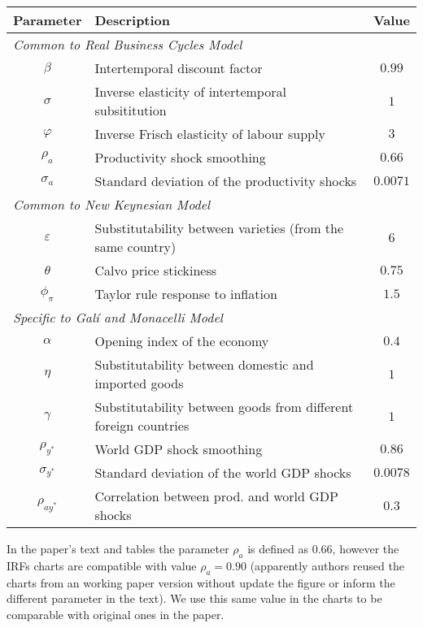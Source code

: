 \documentclass{article}
\begin{document}
\begin{table}[H]
    \centering
    \begin{tabular}{clc}
        \hline
        \textbf{Parameter} & \textbf{Description} & \textbf{Value}\\
        \hline
        \multicolumn{3}{l}{\textit{Common to Real Business Cycles Model}}\\
        $\beta$ & Intertemporal discount factor & $0.99$\\
        $\sigma$ & Inverse elasticity of intertemporal subsititution & $1$\\
        $\varphi$ & Inverse Frisch elasticity of labour supply & $3$\\
        $\rho_a$ & Productivity shock smoothing & $0.66$\\
        $\sigma_a$ & Standard deviation of the productivity shocks & $0.0071$ \\
        \multicolumn{3}{l}{\textit{Common to New Keynesian Model}}\\
        $\varepsilon$ & Substitutability between varieties (from the same country) & $6$\\
        $\theta$ & Calvo price stickiness & $0.75$\\
        $\phi_\pi$ & Taylor rule response to inflation & $1.5$ \\
        \multicolumn{3}{l}{\textit{Specific to Galí and Monacelli Model}}\\
        $\alpha$ & Opening index of the economy  & $0.4$\\
        $\eta$ & Substitutability between domestic and imported goods & $1$\\
        $\gamma$ & Substitutability between goods from different foreign countries & $1$\\
        $\rho_{y^*}$ & World GDP shock smoothing & $0.86$\\
        $\sigma_{y^*}$ & Standard deviation of the world GDP shocks & $0.0078$ \\
        $\rho_{ay^*}$ & Correlation between prod. and world GDP shocks & $0.3$ \\
        \hline
    \end{tabular}
\end{table}

In the paper's text and tables the parameter $\rho_a$ is defined as $0.66$, however the IRFs charts are compatible with value $\rho_a = 0.90$ (apparently authors reused the charts from an working paper version \citep{gali_monacelli2002} without update the figure or inform the different parameter in the text). We use this same value in the charts to be comparable with original ones in the paper. 
\end{document}
